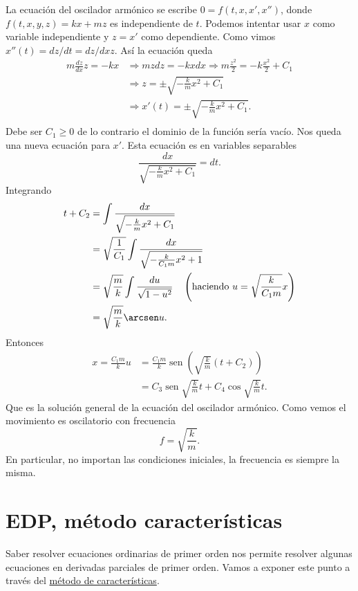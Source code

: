 \documentclass{article}
\DeclareMathOperator{\sen}{sen}
\begin{document}
La ecuación del oscilador armónico se escribe $0=f(t,x,x',x'')$, donde \linebreak $f(t,x,y,z)=kx+mz$ es independiente de $t$. Podemos intentar usar $x$ como variable
independiente y $z=x'$ como dependiente. Como vimos  $x''(t)=dz/dt=dz/dx z$. Así la ecuación queda
\[\begin{split}
   m\frac{dz}{dx}z=-kx &\Longrightarrow mzdz=-kxdx\Longrightarrow m\frac{z^2}{2}=-k\frac{x^2}{2}+C_1\\
   &\Longrightarrow z=\pm\sqrt{-\frac{k}{m}x^2+C_1}\\
   &\Longrightarrow x'(t)=\pm\sqrt{-\frac{k}{m}x^2+C_1}.\\
  \end{split}
\]
Debe ser $C_1\geq 0$ de lo contrario el dominio de la función sería vacío. Nos queda una nueva ecuación para $x'$.
Esta ecuación es en variables separables
\[ \frac{dx}{\sqrt{-\frac{k}{m}x^2+C_1}}=dt.   
\]
 Integrando
\[\begin{split}
   t+C_2 
   &=\int \frac{dx}{\sqrt{-\frac{k}{m}x^2+C_1}}\\
   &= \sqrt{\frac{1}{C_1}} \int \frac{dx}{\sqrt{-\frac{k}{C_1m}x^2+1}} \\  
   &= \sqrt{\frac{m}{k}} \int \frac{du}{\sqrt{1-u^2}}\quad \left(\text{haciendo } u=\sqrt{\frac{k}{C_1m}}x\right)\\ 
   &=\sqrt{\frac{m}{k}}\arcsen u.
  \end{split}
\]
Entonces
\[\begin{split}
    x=\frac{C_1m}{k}u &=\frac{C_1m}{k}\sen \left(\sqrt{\frac{k}{m}}(t+C_2)\right)\\
    &=\boxed{C_3\sen \sqrt{\frac{k}{m}}t+C_4\cos \sqrt{\frac{k}{m}}t}.
  \end{split}
 \]
Que es la solución general de la ecuación del oscilador armónico. Como vemos el movimiento es oscilatorio con frecuencia
\[\boxed{f=\sqrt{\frac{k}{m}} }.\]
En particular, no importan las condiciones iniciales, la frecuencia es siempre la misma. 

 
 



\section{EDP, método características}

Saber resolver ecuaciones ordinarias de primer orden nos permite resolver algunas ecuaciones en derivadas parciales de primer orden.  Vamos a exponer este punto a través del \href{https://en.wikipedia.org/wiki/Method_of_characteristics}{método de características}.
\end{document}
